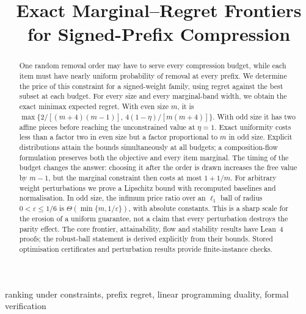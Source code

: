 



\title{Exact Marginal--Regret Frontiers\\for Signed-Prefix Compression}

\author{
}

\maketitle

\begin{abstract}
One random removal order may have to serve every compression budget, while each item must
have nearly uniform probability of removal at every prefix. We determine the price of this
constraint for a signed-weight family, using regret against the best subset at each budget.
For every size and every marginal-band width, we obtain the exact minimax expected regret.
With even size $m$, it is
$\max\{2/[(m+4)(m-1)],\,4(1-\eta)/[m(m+4)]\}$.
With odd size it has two affine pieces before reaching the unconstrained value at $\eta=1$.
Exact uniformity costs less than a factor two in even size but a factor proportional to $m$
in odd size. Explicit distributions attain the bounds simultaneously at all budgets; a
composition-flow formulation preserves both the objective and every item marginal.
The timing of the budget changes the answer: choosing it after the order is drawn increases
the free value by $m-1$, but the marginal constraint then costs at most $1+1/m$.
For arbitrary weight perturbations we prove a Lipschitz bound with recomputed baselines and
normalisation. In odd size, the infimum price ratio over an $\ell_1$ ball of radius
$0<\varepsilon\le1/6$ is $\Theta(\min\{m,1/\varepsilon\})$, with absolute constants.
This is a sharp scale for the erosion of a uniform guarantee, not a claim that every
perturbation destroys the parity effect. The core frontier, attainability, flow and stability
results have Lean~4 proofs; the robust-ball statement is derived explicitly from their bounds.
Stored optimisation certificates and perturbation results provide finite-instance checks.
\end{abstract}

\begin{IEEEkeywords}
ranking under constraints, prefix regret, linear programming duality, formal verification
\end{IEEEkeywords}

